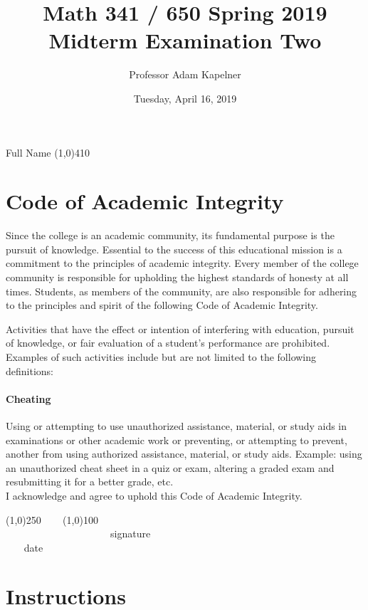 \documentclass[12pt]{article}
\title{Math 341 / 650 Spring 2019 \\ Midterm Examination Two}
\author{Professor Adam Kapelner}
\date{Tuesday, April 16, 2019}
\begin{document}
\maketitle

\noindent Full Name \line(1,0){410}

\thispagestyle{empty}

\section*{Code of Academic Integrity}

\footnotesize
Since the college is an academic community, its fundamental purpose is the pursuit of knowledge. Essential to the success of this educational mission is a commitment to the principles of academic integrity. Every member of the college community is responsible for upholding the highest standards of honesty at all times. Students, as members of the community, are also responsible for adhering to the principles and spirit of the following Code of Academic Integrity.

Activities that have the effect or intention of interfering with education, pursuit of knowledge, or fair evaluation of a student's performance are prohibited. Examples of such activities include but are not limited to the following definitions:

\paragraph{Cheating} Using or attempting to use unauthorized assistance, material, or study aids in examinations or other academic work or preventing, or attempting to prevent, another from using authorized assistance, material, or study aids. Example: using an unauthorized cheat sheet in a quiz or exam, altering a graded exam and resubmitting it for a better grade, etc.
\\

\noindent I acknowledge and agree to uphold this Code of Academic Integrity. \\

\begin{center}
\line(1,0){250} ~~~ \line(1,0){100}\\
~~~~~~~~~~~~~~~~~~~~~signature~~~~~~~~~~~~~~~~~~~~~~~~~~~~~~~~~~~~~~~~~~~~~ date
\end{center}

\normalsize

\section*{Instructions}
\end{document}
